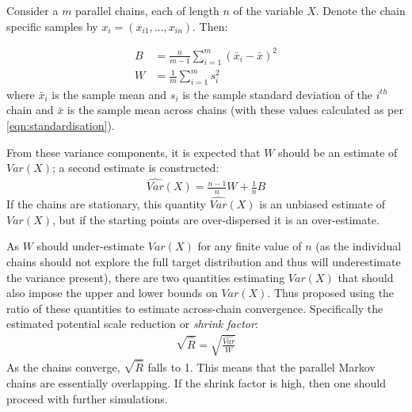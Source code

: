 \documentclass[12pt]{article} %
\begin{document}
	Consider a $m$ parallel chains, each of length $n$ of the variable $X$. Denote the chain specific samples by $x_i = (x_{i1},\ldots,x_{in})$. Then:
	
	\begin{align}
	B &= \frac{n}{m-1}\sum_{i=1}^m (\bar{x}_i - \bar{x})^2 \\
	W &= \frac{1}{m}\sum_{i=1}^m s_i^2
	\end{align}
	where $\bar{x}_i$ is the sample mean and $s_i$ is the sample standard deviation of the $i^{th}$ chain and $\bar{x}$ is the sample mean across chains (with these values calculated as per \eqref{eqn:standardisation}). 
	
	From these variance components, it is expected that $W$ should be an estimate of $Var(X)$; a second estimate is constructed:
	\begin{align}
	\hat{Var}(X) = \frac{n-1}{n}W + \frac{1}{n}B
	\end{align}
	If the chains are stationary, this quantity $\hat{Var}(X)$ is an unbiased estimate of $Var(X)$, but if the starting points are over-dispersed it is an over-estimate.
	
	As $W$ should under-estimate $Var(X)$ for any finite value of $n$ (as the individual chains should not explore the full target distribution and thus will underestimate the variance present), there are two quantities estimating $Var(X)$ that should also impose the upper and lower bounds on $Var(X)$. Thus \citet{GelmanInferenceIterativeSimulation1992} proposed using the ratio of these quantities to estimate across-chain convergence. Specifically the estimated potential scale reduction or \emph{shrink factor}:
	\begin{align}
	\sqrt{\hat{R}} = \sqrt{\frac{\hat{Var}}{W}}
	\end{align}
	As the chains converge, $\sqrt{\hat{R}}$ falls to 1. This means that the parallel Markov chains  are  essentially  overlapping.   If  the  shrink  factor  is  high,  then  one  should  proceed  with further simulations.
	


%	
	
\end{document}
